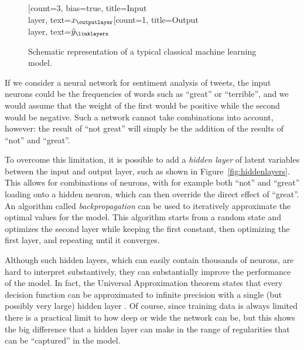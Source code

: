 \begin{figure}
  \centering
 \begin{neuralnetwork}[height=4]
        \newcommand{\x}[2]{$x_#2$}
        \newcommand{\y}[2]{$\hat{y}_#2$}
        [count=3, bias=true, title=Input\\layer, text=\x]
        \outputlayer[count=1, title=Output\\layer, text=\y] \linklayers
 \end{neuralnetwork}
\caption{Schematic representation of a typical classical machine learning model. \label{fig:perceptron}}
\end{figure}

If we consider a neural network for sentiment analysis of tweets,
the input neurons could be the frequencies of words such as ``great'' or ``terrible'',
and we would assume that the weight of the first would be positive while the second would be negative.
Such a network cannot take combinations into account, however:
the result of ``not great'' will simply be the addition of the results of ``not'' and ``great''.

To overcome this limitation, it is possible to add a \emph{hidden layer} of latent variables
between the input and output layer, such as shown in Figure~\ref{fig:hiddenlayers}.
This allows for combinations of neurons, with for example both ``not'' and 	``great'' loading onto a hidden neuron,
which can then override the direct effect of ``great''.
An algorithm called \emph{backpropagation} can be used to iteratively approximate the optimal values for the model.
This algorithm starts from a random state and optimizes the second layer while keeping the first constant,
then optimizing the first layer, and repeating until it converges.

Although such hidden layers, which can easily contain thousands of neurons, are hard to interpret substantively,
they can substantially improve the performance of the model.
In fact, the Universal Approximation theorem states that every decision function can be approximated to infinite precision
with a single (but possibly very large) hidden layer \citep{goldberg2017}.
Of course, since training data is always limited there is a practical limit to how deep or wide the network can be,
but this shows the big difference that a hidden layer can make in the range of regularities that can be ``captured'' in the model.

